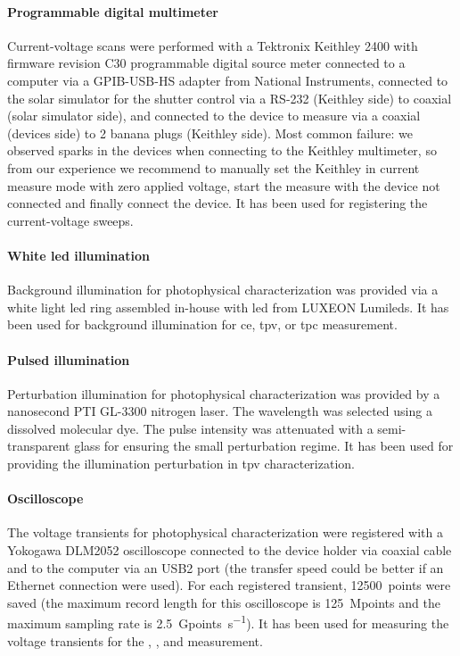 		\paragraph{Programmable digital multimeter} Current-voltage scans were performed with a Tektronix Keithley 2400 with firmware revision C30 programmable digital source meter connected to a computer via a GPIB-USB-HS adapter from National Instruments, connected to the solar simulator for the shutter control via a RS-232 (Keithley side) to coaxial (solar simulator side), and connected to the device to measure via a coaxial (devices side) to 2 banana plugs (Keithley side).
		Most common failure: we observed sparks in the devices when connecting to the Keithley multimeter, so from our experience we recommend to manually set the Keithley in current measure mode with zero applied voltage, start the measure with the device not connected and finally connect the device.
		It has been used for registering the current-voltage sweeps.
		
	\paragraph{White \gls{led} illumination} Background illumination for photophysical characterization was provided via a white light \gls{led} ring assembled in-house with \gls{led} from LUXEON Lumileds.
	It has been used for background illumination for \acrfull{ce}, \acrfull{tpv}, or \acrfull{tpc} measurement.
	
	\paragraph{Pulsed illumination} Perturbation illumination for photophysical characterization was provided by a nanosecond PTI GL-3300 nitrogen laser. The wavelength was selected using a dissolved molecular dye. The pulse intensity was attenuated with a semi-transparent glass for ensuring the small perturbation regime.
	It has been used for providing the illumination perturbation in \acrshort{tpv} characterization.

	\paragraph{Oscilloscope} The voltage transients for photophysical characterization were registered with a Yokogawa DLM2052 oscilloscope connected to the device holder via coaxial cable and to the computer via an USB2 port (the transfer speed could be better if an Ethernet connection were used). For each registered transient, \SI{12500}{points} were saved (the maximum record length for this oscilloscope is \SI{125}{Mpoints} and the maximum sampling rate is \SI{2.5}{Gpoints\per\s}).
	It has been used for measuring the voltage transients for the , , and  measurement.


